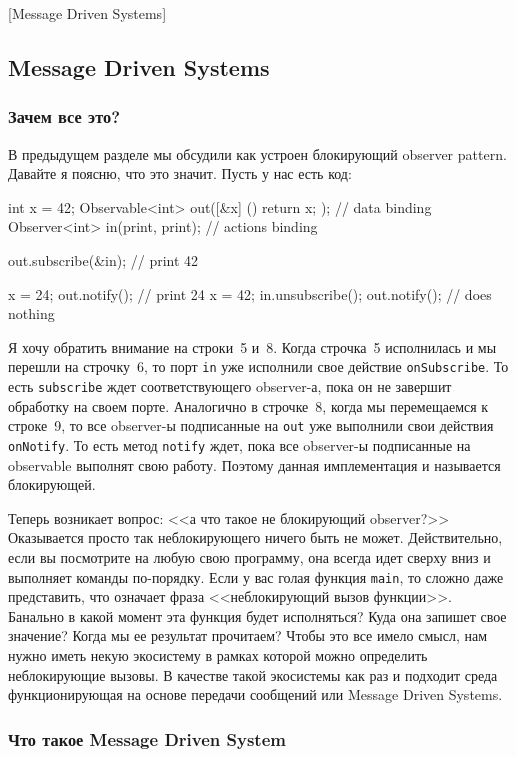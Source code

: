 [Message Driven Systems]


\subsection{Message Driven Systems}
\label{section::MDS}

\subsubsection{Зачем все это?}

В предыдущем разделе мы обсудили как устроен блокирующий observer pattern.
Давайте я поясню, что это значит.
Пусть у нас есть код:
\begin{cppcode}
int x = 42;
Observable<int> out([&x] () { return x; }); // data binding
Observer<int> in(print, print); // actions binding
  
out.subscribe(&in); // print 42
  
x = 24;
out.notify();  // print 24
x = 42;
in.unsubscribe();
out.notify(); // does nothing
\end{cppcode}
Я хочу обратить внимание на строки~5 и~8.
Когда строчка~5 исполнилась и мы перешли на строчку~6, то порт \verb"in" уже исполнили свое действие \verb"onSubscribe".
То есть \verb"subscribe" ждет соответствующего observer-а, пока он не завершит обработку на своем порте.
Аналогично в строчке~8, когда мы перемещаемся к строке~9, то все observer-ы подписанные на \verb"out" уже выполнили свои действия \verb"onNotify".
То есть метод \verb"notify" ждет, пока все observer-ы подписанные на observable выполнят свою работу.
Поэтому данная имплементация и называется блокирующей.

Теперь возникает вопрос: <<а что такое не блокирующий observer?>>
Оказывается просто так неблокирующего ничего быть не может.
Действительно, если вы посмотрите на любую свою программу, она всегда идет сверху вниз и выполняет команды по-порядку.
Если у вас голая функция \verb"main", то сложно даже представить, что означает фраза <<неблокирующий вызов функции>>.
Банально в какой момент эта функция будет исполняться?
Куда она запишет свое значение?
Когда мы ее результат прочитаем?
Чтобы это все имело смысл, нам нужно иметь некую экосистему в рамках которой можно определить неблокирующие вызовы.
В качестве такой экосистемы как раз и подходит среда функционирующая на основе передачи сообщений или Message Driven Systems.

\subsubsection{Что такое Message Driven System}


